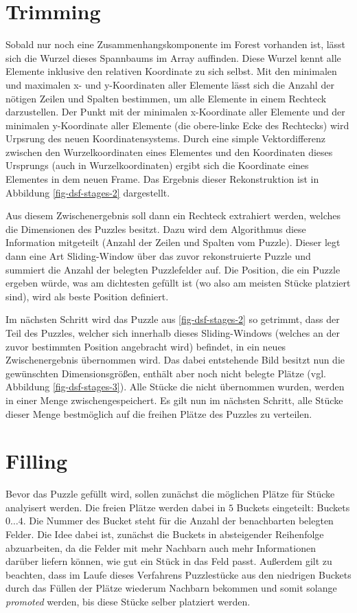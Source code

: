 \documentclass{whswinvcbook}
\begin{document}
\section{Trimming}
Sobald nur noch eine Zusammenhangskomponente im Forest vorhanden ist, lässt sich die Wurzel dieses Spannbaums im Array auffinden. Diese Wurzel kennt alle Elemente inklusive den relativen Koordinate zu sich selbst. Mit den minimalen und maximalen x- und y-Koordinaten aller Elemente lässt sich die Anzahl der nötigen Zeilen und Spalten bestimmen, um alle Elemente in einem Rechteck darzustellen. Der Punkt mit der minimalen x-Koordinate aller Elemente und der minimalen y-Koordinate aller Elemente (die obere-linke Ecke des Rechtecks) wird Urpsrung des neuen Koordinatensystems. Durch eine simple Vektordifferenz zwischen den Wurzelkoordinaten eines Elementes und den Koordinaten dieses Ursprungs (auch in Wurzelkoordinaten) ergibt sich die Koordinate eines Elementes in dem neuen Frame. Das Ergebnis dieser Rekonstruktion ist in Abbildung \ref{fig-dsf-stages-2} dargestellt.

Aus diesem Zwischenergebnis soll dann ein Rechteck extrahiert werden, welches die Dimensionen des Puzzles besitzt. Dazu wird dem Algorithmus diese Information mitgeteilt (Anzahl der Zeilen und Spalten vom Puzzle). Dieser legt dann eine Art Sliding-Window über das zuvor rekonstruierte Puzzle und summiert die Anzahl der belegten Puzzlefelder auf. Die Position, die ein Puzzle ergeben würde, was am dichtesten gefüllt ist (wo also am meisten Stücke platziert sind), wird als beste Position definiert.

Im nächsten Schritt wird das Puzzle aus \ref{fig-dsf-stages-2} so getrimmt, dass der Teil des Puzzles, welcher sich innerhalb dieses Sliding-Windows (welches an der zuvor bestimmten Position angebracht wird) befindet, in ein neues Zwischenergebnis übernommen wird. Das dabei entstehende Bild besitzt nun die gewünschten Dimensionsgrößen, enthält aber noch nicht belegte Plätze (vgl. Abbildung \ref{fig-dsf-stages-3}). Alle Stücke die nicht übernommen wurden, werden in einer Menge zwischengespeichert. Es gilt nun im nächsten Schritt, alle Stücke dieser Menge bestmöglich auf die freihen Plätze des Puzzles zu verteilen.
\section{Filling}
Bevor das Puzzle gefüllt wird, sollen zunächst die möglichen Plätze für Stücke analyisert werden. Die freien Plätze werden dabei in $5$ Buckets eingeteilt: Buckets $0\dots4$. Die Nummer des Bucket steht für die Anzahl der benachbarten belegten Felder. Die Idee dabei ist, zunächst die Buckets in absteigender Reihenfolge abzuarbeiten, da die Felder mit mehr Nachbarn auch mehr Informationen darüber liefern können, wie gut ein Stück in das Feld passt. Außerdem gilt zu beachten, dass im Laufe dieses Verfahrens Puzzlestücke aus den niedrigen Buckets durch das Füllen der Plätze wiederum Nachbarn bekommen und somit solange \textit{promoted} werden, bis diese Stücke selber platziert werden.
\end{document}
